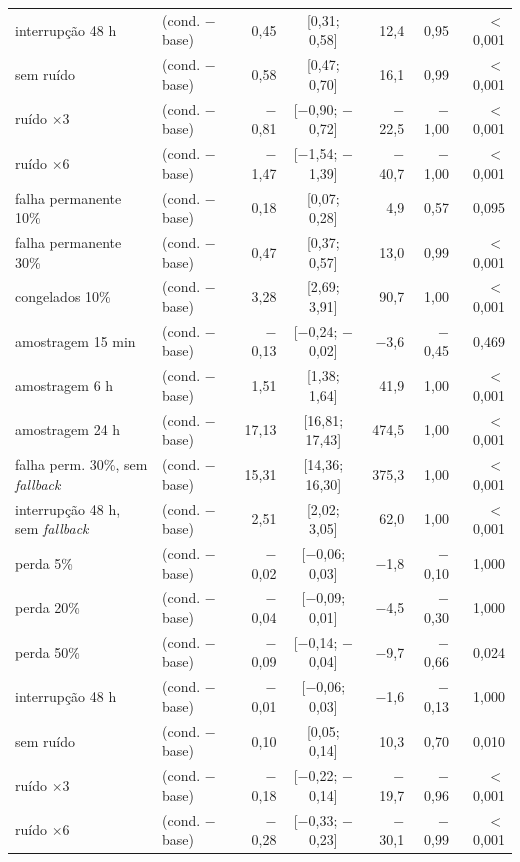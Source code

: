 \begin{tabular}{@{}llrcrrr@{}}
interrupção 48 h & \polC{} (cond. $-$ base) & 0,45 & [0,31; 0,58] & 12,4 & 0,95 & $<$0,001 \\
sem ruído & \polC{} (cond. $-$ base) & 0,58 & [0,47; 0,70] & 16,1 & 0,99 & $<$0,001 \\
ruído $\times$3 & \polC{} (cond. $-$ base) & $-$0,81 & [$-$0,90; $-$0,72] & $-$22,5 & $-$1,00 & $<$0,001 \\
ruído $\times$6 & \polC{} (cond. $-$ base) & $-$1,47 & [$-$1,54; $-$1,39] & $-$40,7 & $-$1,00 & $<$0,001 \\
falha permanente 10\% & \polC{} (cond. $-$ base) & 0,18 & [0,07; 0,28] & 4,9 & 0,57 & 0,095 \\
falha permanente 30\% & \polC{} (cond. $-$ base) & 0,47 & [0,37; 0,57] & 13,0 & 0,99 & $<$0,001 \\
congelados 10\% & \polC{} (cond. $-$ base) & 3,28 & [2,69; 3,91] & 90,7 & 1,00 & $<$0,001 \\
amostragem 15 min & \polC{} (cond. $-$ base) & $-$0,13 & [$-$0,24; $-$0,02] & $-$3,6 & $-$0,45 & 0,469 \\
amostragem 6 h & \polC{} (cond. $-$ base) & 1,51 & [1,38; 1,64] & 41,9 & 1,00 & $<$0,001 \\
amostragem 24 h & \polC{} (cond. $-$ base) & 17,13 & [16,81; 17,43] & 474,5 & 1,00 & $<$0,001 \\
falha perm. 30\%, sem \emph{fallback} & \polC{} (cond. $-$ base) & 15,31 & [14,36; 16,30] & 375,3 & 1,00 & $<$0,001 \\
interrupção 48 h, sem \emph{fallback} & \polC{} (cond. $-$ base) & 2,51 & [2,02; 3,05] & 62,0 & 1,00 & $<$0,001 \\
perda 5\% & \polD{} (cond. $-$ base) & $-$0,02 & [$-$0,06; 0,03] & $-$1,8 & $-$0,10 & 1,000 \\
perda 20\% & \polD{} (cond. $-$ base) & $-$0,04 & [$-$0,09; 0,01] & $-$4,5 & $-$0,30 & 1,000 \\
perda 50\% & \polD{} (cond. $-$ base) & $-$0,09 & [$-$0,14; $-$0,04] & $-$9,7 & $-$0,66 & 0,024 \\
interrupção 48 h & \polD{} (cond. $-$ base) & $-$0,01 & [$-$0,06; 0,03] & $-$1,6 & $-$0,13 & 1,000 \\
sem ruído & \polD{} (cond. $-$ base) & 0,10 & [0,05; 0,14] & 10,3 & 0,70 & 0,010 \\
ruído $\times$3 & \polD{} (cond. $-$ base) & $-$0,18 & [$-$0,22; $-$0,14] & $-$19,7 & $-$0,96 & $<$0,001 \\
ruído $\times$6 & \polD{} (cond. $-$ base) & $-$0,28 & [$-$0,33; $-$0,23] & $-$30,1 & $-$0,99 & $<$0,001 \\

\end{tabular}
